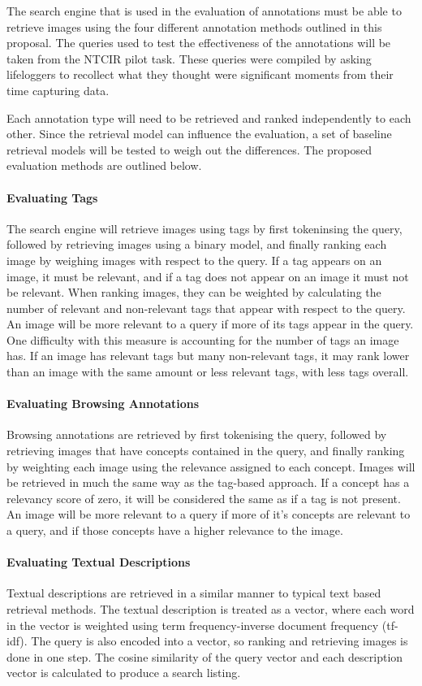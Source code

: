 \documentclass[12pt,a4paper]{article}
\begin{document}
The search engine that is used in the evaluation of annotations must be able to retrieve images using the four different annotation methods outlined in this proposal. The queries used to test the effectiveness of the annotations will be taken from the NTCIR pilot task. These queries were compiled by asking lifeloggers to recollect what they thought were significant moments from their time capturing data.

Each annotation type will need to be retrieved and ranked independently to each other. Since the retrieval model can influence the evaluation, a set of baseline retrieval models will be tested to weigh out the differences. The proposed evaluation methods are outlined below.

\paragraph{Evaluating Tags}
The search engine will retrieve images using tags by first tokeninsing the query, followed by retrieving images using a binary model, and finally ranking each image by weighing images with respect to the query. If a tag appears on an image, it must be relevant, and if a tag does not appear on an image it must not be relevant. When ranking images, they can be weighted by calculating the number of relevant and non-relevant tags that appear with respect to the query. An image will be more relevant to a query if more of its tags appear in the query. One difficulty with this measure is accounting for the number of tags an image has. If an image has relevant tags but many non-relevant tags, it may rank lower than an image with the same amount or less relevant tags, with less tags overall.

\paragraph{Evaluating Browsing Annotations}
Browsing annotations are retrieved by first tokenising the query, followed by retrieving images that have concepts contained in the query, and finally ranking by weighting each image using the relevance assigned to each concept. Images will be retrieved in much the same way as the tag-based approach. If a concept has a relevancy score of zero, it will be considered the same as if a tag is not present. An image will be more relevant to a query if more of it's concepts are relevant to a query, and if those concepts have a higher relevance to the image.

\paragraph{Evaluating Textual Descriptions}
Textual descriptions are retrieved in a similar manner to typical text based retrieval methods. The textual description is treated as a vector, where each word in the vector is weighted using term frequency-inverse document frequency (tf-idf). The query is also encoded into a vector, so ranking and retrieving images is done in one step. The cosine similarity of the query vector and each description vector is calculated to produce a search listing.
\end{document}

